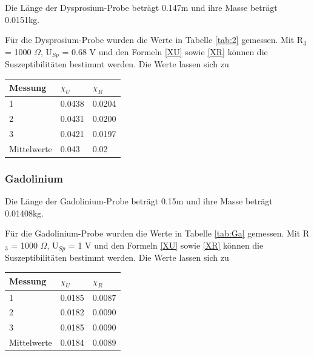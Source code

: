Die Länge der Dysprosium-Probe beträgt 0.147m und ihre Masse beträgt 0.0151kg. 

\noindent Für die Dysprosium-Probe wurden die Werte in Tabelle \ref{tab:2} gemessen. Mit R$_3$ = 1000 $\Omega$, U$_{Sp}$ = 0.68 V und den Formeln \ref{XU} sowie \ref{XR} können die Suszeptibilitäten bestimmt werden. Die Werte lassen sich zu 

\begin{minipage}{\linewidth}
    \begin{table}[H]
        \centering
    \begin{tabular}{lll}
        \toprule
        Messung & $\chi_U$ & $\chi_R$ \\
        \midrule
        1 & 0.0438 & 0.0204 \\
        2 & 0.0431 & 0.0200 \\
        3 & 0.0421 & 0.0197 \\
        \midrule
        Mittelwerte & 0.043 & 0.02 \\
        \bottomrule   
    \end{tabular}
    
    \label{tab:4}
\end{table}
\end{minipage}

\subsubsection{Gadolinium}

Die Länge der Gadolinium-Probe beträgt 0.15m und ihre Masse beträgt 0.01408kg. 

\noindent Für die Gadolinium-Probe wurden die Werte in Tabelle \ref{tab:Ga} gemessen. Mit R$_3$ = 1000 $\Omega$, U$_{Sp}$ = 1 V und den Formeln \ref{XU} sowie \ref{XR} können die Suszeptibilitäten bestimmt werden. Die Werte lassen sich zu 

\begin{minipage}{\linewidth}
    \begin{table}[H]
        \centering
    \begin{tabular}{lll}
        \toprule
        Messung & $\chi_U$ & $\chi_R$ \\
        \midrule
        1 & 0.0185 & 0.0087 \\
        2 & 0.0182 & 0.0090 \\
        3 & 0.0185 & 0.0090 \\
        \midrule
        Mittelwerte & 0.0184 & 0.0089 \\
        \bottomrule   
    \end{tabular}
    
    \label{tab:3}
\end{table}
\end{minipage}

